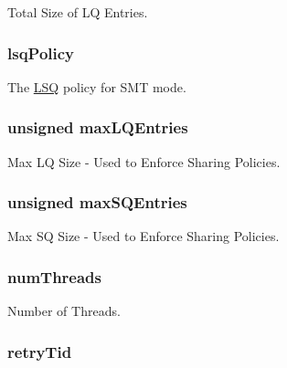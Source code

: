 \label{classLSQ_aafa99d800d574095881acbacdbbbcc47}
Total Size of LQ Entries. \hypertarget{classLSQ_a28ca1f0961b84f3386b592d1e3e1b411}{
\subsubsection[{lsqPolicy}]{ {\bf lsqPolicy}}}
\label{classLSQ_a28ca1f0961b84f3386b592d1e3e1b411}
The \hyperlink{classLSQ}{LSQ} policy for SMT mode. \hypertarget{classLSQ_ad2f4fd027fe71a87d5ee2d798ec19ac3}{
\subsubsection[{maxLQEntries}]{\setlength{\rightskip}{0pt plus 5cm}unsigned {\bf maxLQEntries}}}
\label{classLSQ_ad2f4fd027fe71a87d5ee2d798ec19ac3}
Max LQ Size -\/ Used to Enforce Sharing Policies. \hypertarget{classLSQ_a0e9eef7cd7598f554f1f89c35cb08128}{
\subsubsection[{maxSQEntries}]{\setlength{\rightskip}{0pt plus 5cm}unsigned {\bf maxSQEntries}}}
\label{classLSQ_a0e9eef7cd7598f554f1f89c35cb08128}
Max SQ Size -\/ Used to Enforce Sharing Policies. \hypertarget{classLSQ_a88377f855dbf5adeeecb06b5bb821d35}{
\subsubsection[{numThreads}]{ {\bf numThreads}}}
\label{classLSQ_a88377f855dbf5adeeecb06b5bb821d35}
Number of Threads. \hypertarget{classLSQ_a865aaad70625f17392c717930860d386}{
\subsubsection[{retryTid}]{ {\bf retryTid}}}
